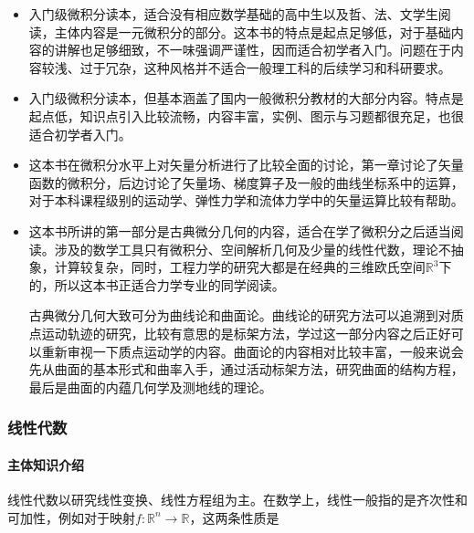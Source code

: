 \begin{itemize}
	\item \textcite[普林斯顿微积分读本]{杨爽2010普林斯顿微积分读本}

	      入门级微积分读本，适合没有相应数学基础的高中生以及哲、法、文学生阅读，主体内容是一元微积分的部分。这本书的特点是起点足够低，对于基础内容的讲解也足够细致，不一味强调严谨性，因而适合初学者入门。问题在于内容较浅、过于冗杂，这种风格并不适合一般理工科的后续学习和科研要求。

	\item \textcite[托马斯大学微积分]{李伯民2009托马斯大学微积分}

	      入门级微积分读本，但基本涵盖了国内一般微积分教材的大部分内容。特点是起点低，知识点引入比较流畅，内容丰富，实例、图示与习题都很充足，也很适合初学者入门。

	\item \textcite[工程数学——矢量分析与场论]{谢树艺2015工程数学}

	      这本书在微积分水平上对矢量分析进行了比较全面的讨论，第一章讨论了矢量函数的微积分，后边讨论了矢量场、梯度算子及一般的曲线坐标系中的运算，对于本科课程级别的运动学、弹性力学和流体力学中的矢量运算比较有帮助。

	\item \textcite[微分几何]{彭家贵2002微分几何}

	      这本书所讲的第一部分是古典微分几何的内容，适合在学了微积分之后适当阅读。涉及的数学工具只有微积分、空间解析几何及少量的线性代数，理论不抽象，计算较复杂，同时，工程力学的研究大都是在经典的三维欧氏空间$\mathbb{R}^3$下的，所以这本书正适合力学专业的同学阅读。

	      古典微分几何大致可分为曲线论和曲面论。曲线论的研究方法可以追溯到对质点运动轨迹的研究，比较有意思的是标架方法，学过这一部分内容之后正好可以重新审视一下质点运动学的内容。曲面论的内容相对比较丰富，一般来说会先从曲面的基本形式和曲率入手，通过活动标架方法，研究曲面的结构方程，最后是曲面的内蕴几何学及测地线的理论。
\end{itemize}
\subsubsection{线性代数}

\paragraph{主体知识介绍}

线性代数以研究线性变换、线性方程组为主。在数学上，线性一般指的是齐次性和可加性，例如对于映射$f:\mathbb{R}^n\to\mathbb{R}$，这两条性质是

